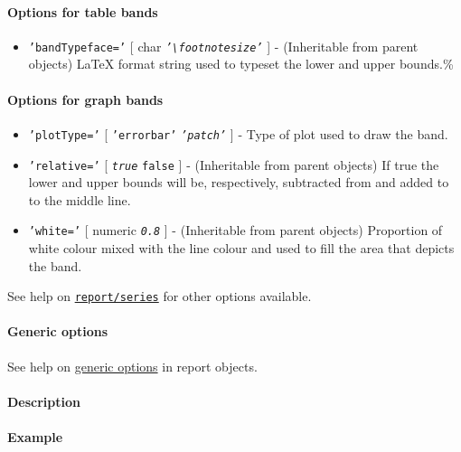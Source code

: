 \paragraph{Options for table bands}

\begin{itemize}
\itemsep1pt\parskip0pt
\item
  \texttt{'bandTypeface='} {[} char \textbar{}
  \emph{\texttt{'\textbackslash{}footnotesize'}} {]} - (Inheritable from
  parent objects) LaTeX format string used to typeset the lower and
  upper bounds.\%
\end{itemize}

\paragraph{Options for graph bands}

\begin{itemize}
\item
  \texttt{'plotType='} {[} \texttt{'errorbar'} \textbar{}
  \emph{\texttt{'patch'}} {]} - Type of plot used to draw the band.
\item
  \texttt{'relative='} {[} \emph{\texttt{true}} \textbar{}
  \texttt{false} {]} - (Inheritable from parent objects) If true the
  lower and upper bounds will be, respectively, subtracted from and
  added to to the middle line.
\item
  \texttt{'white='} {[} numeric \textbar{} \emph{\texttt{0.8}} {]} -
  (Inheritable from parent objects) Proportion of white colour mixed
  with the line colour and used to fill the area that depicts the band.
\end{itemize}

See help on \href{report/series}{\texttt{report/series}} for other
options available.

\paragraph{Generic options}

See help on \href{report/Contents}{generic options} in report objects.

\paragraph{Description}

\paragraph{Example}


